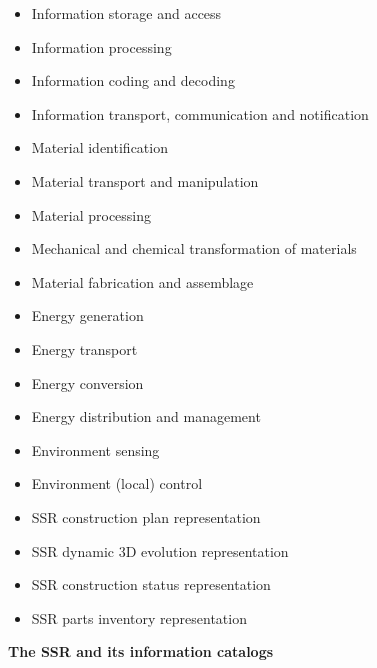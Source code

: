 \documentclass[letterpaper]{article}
\begin{document}
\bigskip

\begin{itemize}
\item Information storage and access
\item Information processing
\item Information coding and decoding
\item Information transport, communication and notification
\end{itemize}

\bigskip

\begin{itemize}
\item Material identification
\item Material transport and manipulation
\item Material processing
\item Mechanical and chemical transformation of materials
\item Material fabrication and assemblage
\end{itemize}

\bigskip

\begin{itemize}
\item Energy generation
\item Energy transport
\item Energy conversion
\item Energy distribution and management
\end{itemize}

\bigskip

\begin{itemize}
\item Environment sensing
\item Environment (local) control
\end{itemize}

\bigskip

\begin{itemize}
\item SSR construction plan representation
\item SSR dynamic 3D evolution representation
\item SSR construction status representation
\item SSR parts inventory representation
\end{itemize}

\bigskip


\bigskip

{\bfseries
\hypertarget{RefHeading3110306210128}{}The SSR and its information
catalogs}
\end{document}
